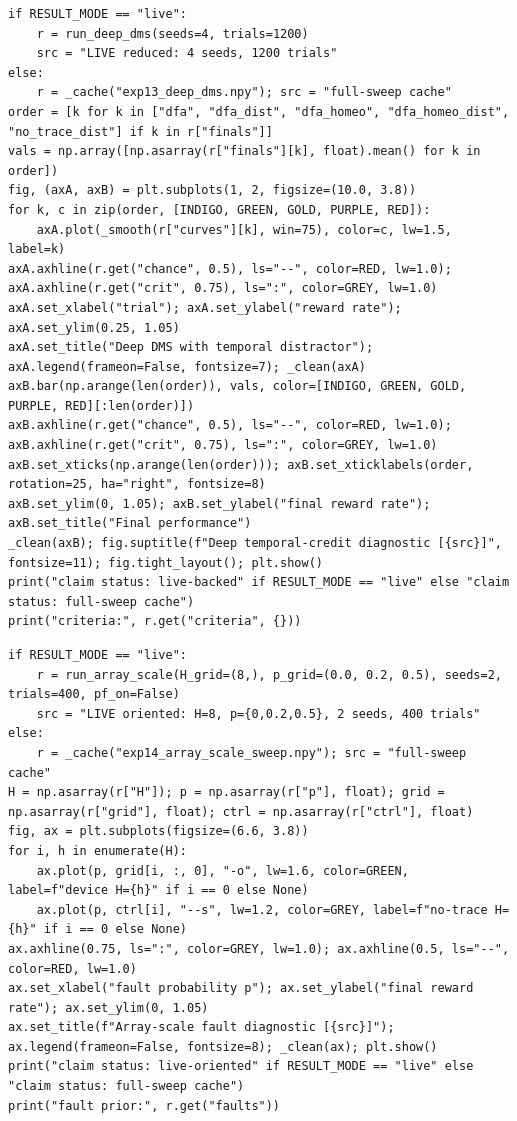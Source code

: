 \begin{lstlisting}[caption={03\_deep\_local\_learning.ipynb code cell 3},label={lst:mrl-nb-03-deep-local-learning-3}]
if RESULT_MODE == "live":
    r = run_deep_dms(seeds=4, trials=1200)
    src = "LIVE reduced: 4 seeds, 1200 trials"
else:
    r = _cache("exp13_deep_dms.npy"); src = "full-sweep cache"
order = [k for k in ["dfa", "dfa_dist", "dfa_homeo", "dfa_homeo_dist", "no_trace_dist"] if k in r["finals"]]
vals = np.array([np.asarray(r["finals"][k], float).mean() for k in order])
fig, (axA, axB) = plt.subplots(1, 2, figsize=(10.0, 3.8))
for k, c in zip(order, [INDIGO, GREEN, GOLD, PURPLE, RED]):
    axA.plot(_smooth(r["curves"][k], win=75), color=c, lw=1.5, label=k)
axA.axhline(r.get("chance", 0.5), ls="--", color=RED, lw=1.0); axA.axhline(r.get("crit", 0.75), ls=":", color=GREY, lw=1.0)
axA.set_xlabel("trial"); axA.set_ylabel("reward rate"); axA.set_ylim(0.25, 1.05)
axA.set_title("Deep DMS with temporal distractor"); axA.legend(frameon=False, fontsize=7); _clean(axA)
axB.bar(np.arange(len(order)), vals, color=[INDIGO, GREEN, GOLD, PURPLE, RED][:len(order)])
axB.axhline(r.get("chance", 0.5), ls="--", color=RED, lw=1.0); axB.axhline(r.get("crit", 0.75), ls=":", color=GREY, lw=1.0)
axB.set_xticks(np.arange(len(order))); axB.set_xticklabels(order, rotation=25, ha="right", fontsize=8)
axB.set_ylim(0, 1.05); axB.set_ylabel("final reward rate"); axB.set_title("Final performance")
_clean(axB); fig.suptitle(f"Deep temporal-credit diagnostic [{src}]", fontsize=11); fig.tight_layout(); plt.show()
print("claim status: live-backed" if RESULT_MODE == "live" else "claim status: full-sweep cache")
print("criteria:", r.get("criteria", {}))
\end{lstlisting}

\begin{lstlisting}[caption={03\_deep\_local\_learning.ipynb code cell 4},label={lst:mrl-nb-03-deep-local-learning-4}]
if RESULT_MODE == "live":
    r = run_array_scale(H_grid=(8,), p_grid=(0.0, 0.2, 0.5), seeds=2, trials=400, pf_on=False)
    src = "LIVE oriented: H=8, p={0,0.2,0.5}, 2 seeds, 400 trials"
else:
    r = _cache("exp14_array_scale_sweep.npy"); src = "full-sweep cache"
H = np.asarray(r["H"]); p = np.asarray(r["p"], float); grid = np.asarray(r["grid"], float); ctrl = np.asarray(r["ctrl"], float)
fig, ax = plt.subplots(figsize=(6.6, 3.8))
for i, h in enumerate(H):
    ax.plot(p, grid[i, :, 0], "-o", lw=1.6, color=GREEN, label=f"device H={h}" if i == 0 else None)
    ax.plot(p, ctrl[i], "--s", lw=1.2, color=GREY, label=f"no-trace H={h}" if i == 0 else None)
ax.axhline(0.75, ls=":", color=GREY, lw=1.0); ax.axhline(0.5, ls="--", color=RED, lw=1.0)
ax.set_xlabel("fault probability p"); ax.set_ylabel("final reward rate"); ax.set_ylim(0, 1.05)
ax.set_title(f"Array-scale fault diagnostic [{src}]"); ax.legend(frameon=False, fontsize=8); _clean(ax); plt.show()
print("claim status: live-oriented" if RESULT_MODE == "live" else "claim status: full-sweep cache")
print("fault prior:", r.get("faults"))
\end{lstlisting}

